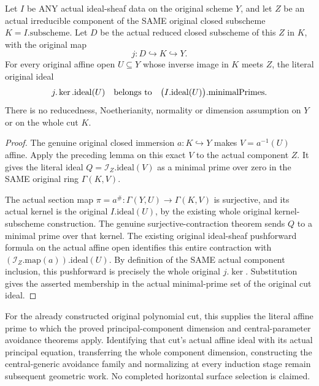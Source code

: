 \begin{theorem}
\label{thm:pl-gauss-original-cut-component-affine-minimal-prime}
\leanok
Let $I$ be ANY actual ideal-sheaf data on the original scheme $Y$, and
let $Z$ be an actual irreducible component of the SAME original closed
subscheme $K=I.\mathrm{subscheme}$. Let $D$ be the actual reduced closed
subscheme of this $Z$ in $K$, with the original map
\[
 j:D\hookrightarrow K\hookrightarrow Y.
\]
For every original affine open $U\subseteq Y$ whose inverse image in
$K$ meets $Z$, the literal original ideal
\[
 j.\ker.\mathrm{ideal}(U)
 \quad\hbox{belongs to}\quad
 \bigl(I.\mathrm{ideal}(U)\bigr).\mathrm{minimalPrimes}.
\]
There is no reducedness, Noetherianity, normality or dimension assumption
on $Y$ or on the whole cut $K$.
\end{theorem}
\begin{proof}
The genuine original closed immersion $a:K\hookrightarrow Y$ makes
$V=a^{-1}(U)$ affine. Apply the preceding lemma on this exact $V$ to
the actual component $Z$. It gives the literal ideal
$Q=\mathcal I_Z.\mathrm{ideal}(V)$ as a minimal prime over zero in the
SAME original ring $\Gamma(K,V)$.

The actual section map $\pi=a^\#: \Gamma(Y,U)\to\Gamma(K,V)$ is
surjective, and its actual kernel is the original $I.\mathrm{ideal}(U)$,
by the existing whole original kernel-subscheme construction. The
genuine surjective-contraction theorem sends $Q$ to a minimal prime
over that kernel. The existing original ideal-sheaf pushforward formula
on the actual affine open identifies this entire contraction with
$(\mathcal I_Z.\mathrm{map}(a)).\mathrm{ideal}(U)$. By definition of
the SAME actual component inclusion, this pushforward is precisely the
whole original $j.\ker$. Substitution gives the asserted membership in
the actual minimal-prime set of the original cut ideal.
\end{proof}

For the already constructed original polynomial cut, this supplies the
literal affine prime to which the proved principal-component dimension
and central-parameter avoidance theorems apply. Identifying that cut's
actual affine ideal with its actual principal equation, transferring the
whole component dimension, constructing the central-generic avoidance
family and normalizing at every induction stage remain subsequent
geometric work. No completed horizontal surface selection is claimed.
